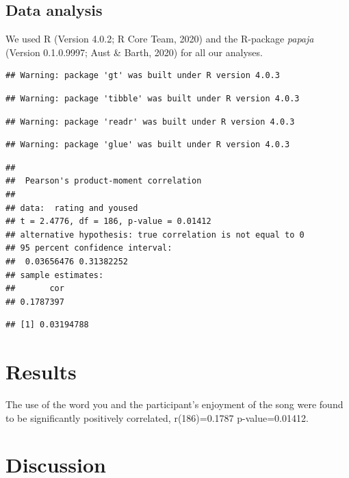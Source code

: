 \documentclass[
  english,
  man]{apa6}
\begin{document}
\hypertarget{data-analysis}{%
\subsection{Data analysis}\label{data-analysis}}

We used R (Version 4.0.2; R Core Team, 2020) and the R-package \emph{papaja} (Version 0.1.0.9997; Aust \& Barth, 2020) for all our analyses.

\begin{verbatim}
## Warning: package 'gt' was built under R version 4.0.3
\end{verbatim}

\begin{verbatim}
## Warning: package 'tibble' was built under R version 4.0.3
\end{verbatim}

\begin{verbatim}
## Warning: package 'readr' was built under R version 4.0.3
\end{verbatim}

\begin{verbatim}
## Warning: package 'glue' was built under R version 4.0.3
\end{verbatim}

\begin{verbatim}
## 
##  Pearson's product-moment correlation
## 
## data:  rating and yoused
## t = 2.4776, df = 186, p-value = 0.01412
## alternative hypothesis: true correlation is not equal to 0
## 95 percent confidence interval:
##  0.03656476 0.31382252
## sample estimates:
##       cor 
## 0.1787397
\end{verbatim}

\begin{verbatim}
## [1] 0.03194788
\end{verbatim}

\hypertarget{results}{%
\section{Results}\label{results}}

The use of the word you and the participant's enjoyment of the song were found to be significantly positively correlated, r(186)=0.1787 p-value=0.01412.

\hypertarget{discussion}{%
\section{Discussion}\label{discussion}}
\end{document}
